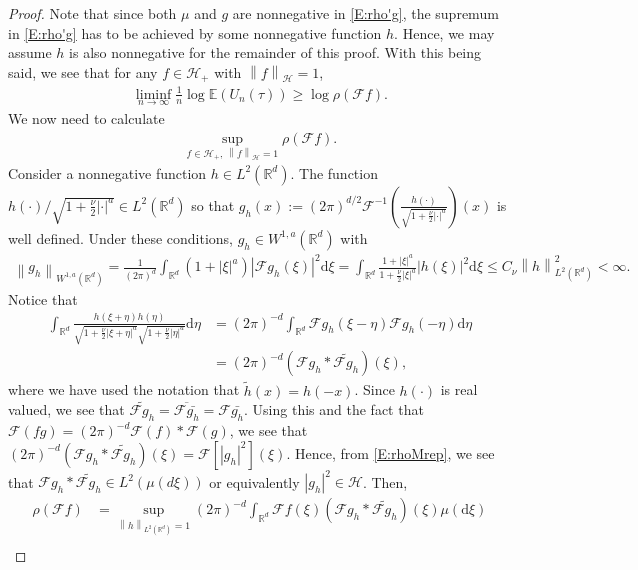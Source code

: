\documentclass[a4paper,11pt]{article}
\numberwithin{equation}{section}
\numberwithin{equation}{section}
\theoremstyle{plain}
\theoremstyle{definition}
\newcommand{\ud}{\ensuremath{\mathrm{d} }}
\newcommand{\Norm}[1]{\left\|  #1   \right\|}
\newcommand{\R}{\mathbb{R}}
\begin{document}
\begin{proof}
  Note that since both $\mu$ and $g$ are nonnegative in \eqref{E:rho'g}, the supremum in
  \eqref{E:rho'g} has to be achieved by some nonnegative function $h$. Hence, we may assume $h$ is
  also nonnegative for the remainder of this proof. With this being said, we see that for any $f \in
  \mathcal{H}_+$ with $\Norm{f}_\mathcal{H} =1$,
	\begin{align*}
		\liminf_{n \to \infty} \frac{1}{n}\log \mathbb{E}(U_n(\tau)) \ge \log \rho(\mathcal{F}f).
	\end{align*}
  We now need to calculate
	\begin{align*}
		\sup_{f \in \mathcal{H}_+, \: \Norm{f}_{\mathcal{H}}=1} \rho\left(\mathcal{F}f\right).
	\end{align*}
  Consider a nonnegative function $h\in L^2(\R^d)$. The function
  $h(\cdot)/\sqrt{1+\frac{\nu}{2}|\cdot|^a} \in L^2(\R^d)$ so that $g_h(x) := (2\pi)^{d/2}
  \mathcal{F}^{-1}\left( \frac{h(\cdot)}{\sqrt{1+\frac{\nu}{2}|\cdot|^a}} \right)(x)$ is well
  defined. Under these conditions, $g_h \in W^{1,a}(\R^d)$ with
	\begin{align*}
		\Norm{g_h}_{W^{1,a}(\R^d)} = \frac{1}{(2\pi)^d} \int_{\R^d} (1+|\xi|^a) |\mathcal{F}g_h(\xi)|^2\ud\xi
		= \int_{\R^d} \frac{1+|\xi|^a}{1+\frac{\nu}{2}|\xi|^a} |h(\xi)|^2 \ud \xi
		\le C_\nu \Norm{h}_{L^2(\R^d)}^2 <\infty.
	\end{align*}
  Notice that
	\begin{align*}
		\int_{\R^d} \frac{h(\xi +
		\eta)h(\eta)}{\sqrt{1+\frac{\nu}{2}|\xi+\eta|^a}\sqrt{1+\frac{\nu}{2}|\eta|^a}}  \ud \eta
    & = (2\pi)^{-d}\int_{\R^d} \mathcal{F}g_h(\xi-\eta)\mathcal{F}g_h(-\eta) \ud \eta \\
    & =(2\pi)^{-d} (\mathcal{F}g_h*\widetilde{\mathcal{F}g_h})(\xi),
	\end{align*}
  where we have used the notation that $\widetilde{h}(x) = h(-x)$.  Since $h(\cdot)$ is real valued,
  we see that $\widetilde{\mathcal{F}g_h} = \overline{\mathcal{F}\bar{g_h}}= \mathcal{F}\bar{g_h} $.
  Using this and the fact that $\mathcal{F}(fg) = (2\pi)^{-d}\mathcal{F}(f)*\mathcal{F}(g)$, we see
  that $(2\pi)^{-d}(\mathcal{F}g_h*\widetilde{\mathcal{F}g_h})(\xi)
  =\mathcal{F}\left[|g_h|^2\right](\xi)$. Hence, from \eqref{E:rhoMrep}, we see that $\mathcal{F}g_h
  * \widetilde{\mathcal{F}g_h}\in L^2\left(\mu(d\xi)\right)$ or equivalently $|g_h|^2\in \mathcal{H}$.
  Then,
	\begin{align*}
		\rho(\mathcal{F}f) & = \sup_{\Norm{h}_{L^2(\R^d)}=1}(2\pi)^{-d} \int_{\R^d}\mathcal{F}f(\xi)(\mathcal{F}g_h*\widetilde{\mathcal{F}g_h})(\xi) \mu(\ud \xi) \\

\end{align*}
\end{proof}
\end{document}
